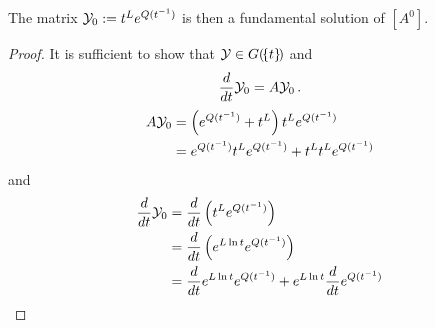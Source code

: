 \begin{lem}
  The matrix $\mathcal{Y}_0:=t^Le^{Q(t^{-1})}$ is then a fundamental solution of
  $[A^0]$.
\end{lem}
\begin{proof}
  It is sufficient to show that $\mathcal{Y}\in G(\!\{t\}\!)$ and
  \[
    \frac{d}{dt}\mathcal{Y}_0=A\mathcal{Y}_0 \,.
  \]
  \begin{align*}
    A\mathcal{Y}_0
    &=\left(e^{Q(t^{-1})}+t^L\right)t^Le^{Q(t^{-1})}
  \\&=e^{Q(t^{-1})}t^Le^{Q(t^{-1})}+t^Lt^Le^{Q(t^{-1})}
  \end{align*}
  and 
  \begin{align*}
    \frac{d}{dt}\mathcal{Y}_0
    &=\frac{d}{dt}\left(t^Le^{Q(t^{-1})}\right)
  \\&=\frac{d}{dt}\left(e^{L\ln t}e^{Q(t^{-1})}\right)
  \\&=\frac{d}{dt}e^{L\ln t}e^{Q(t^{-1})}+e^{L\ln t}\frac{d}{dt}e^{Q(t^{-1})}
  \end{align*}
  \TODO{}
\end{proof}






